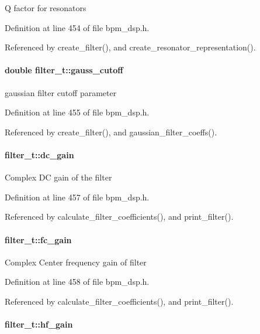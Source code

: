 Q factor for resonators 

Definition at line 454 of file bpm\_\-dsp.h.

Referenced by create\_\-filter(), and create\_\-resonator\_\-representation().
\paragraph[gauss\_\-cutoff]{\setlength{\rightskip}{0pt plus 5cm}double {\bf filter\_\-t::gauss\_\-cutoff}}\hfill\label{structfilter__t_bb943262c0d73b7dc911fc5ec4f155a6}


gaussian filter cutoff parameter 

Definition at line 455 of file bpm\_\-dsp.h.

Referenced by create\_\-filter(), and gaussian\_\-filter\_\-coeffs().
\paragraph[dc\_\-gain]{ {\bf filter\_\-t::dc\_\-gain}}\hfill\label{structfilter__t_1fb8ef235aebd042e645d032a45e71df}


Complex DC gain of the filter 

Definition at line 457 of file bpm\_\-dsp.h.

Referenced by calculate\_\-filter\_\-coefficients(), and print\_\-filter().
\paragraph[fc\_\-gain]{ {\bf filter\_\-t::fc\_\-gain}}\hfill\label{structfilter__t_be3e7477ffd82a35ab7c0e7dcdc4a314}


Complex Center frequency gain of filter 

Definition at line 458 of file bpm\_\-dsp.h.

Referenced by calculate\_\-filter\_\-coefficients(), and print\_\-filter().
\paragraph[hf\_\-gain]{ {\bf filter\_\-t::hf\_\-gain}}\hfill\label{structfilter__t_a383fcf8e8345bd268d40a374276bb0f}


